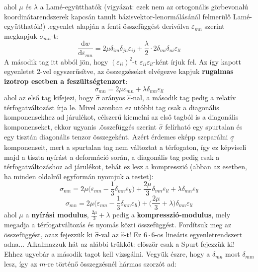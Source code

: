 \documentclass[a4paper, 12pt, titlepage]{article}
\begin{document}
ahol $\mu$ és $\lambda$ a Lamé-együtthatók (vigyázat: ezek nem az ortogonális görbevonalú koordinátarendszerek kapcsán tanult bázisvektor-lenormálásánál felmerülő Lamé-együtthatók!)
\newline
{}.\hspace{1mm}egyenlet alapján a fenti összefüggést deriválva $\varepsilon_{mn}$ szerint megkapjuk $\sigma_{mn}$-t:
\[\frac{\mathrm{d}w}{\mathrm{d}\varepsilon_{mn}}=2\mu\delta_{im}\delta_{jn}\varepsilon_{ij}+\frac{\lambda}{2}\cdot 2\delta_{mi}\delta_{ni}\varepsilon_{ll}\]
A második tag itt abból jön, hogy $(\varepsilon_{ii})^{2}$-t $\varepsilon_{ii}\varepsilon_{ll}$-ként írjuk fel. Az így kapott egyenletet 2-vel egyszerűsítve, az összegzéseket elvégezve kapjuk \textbf{rugalmas izotrop esetben a feszültségtenzort}:
	\begin{equation}
\sigma_{mn}=2\mu\varepsilon_{mn}+\lambda\delta_{mn}\varepsilon_{ll} %
	\label{eq:sigma}
	\end{equation}
ahol az első tag kifejezi, hogy $\hat{\sigma}$ arányos $\hat{\varepsilon}$-nal, a második tag pedig a relatív térfogatváltozást írja le. Mivel azonban ez utóbbi tag csak a diagonális komponensekhez ad járulékot, célszerű kiemelni az első tagból is a diagonális komponenseket, ekkor ugyanis .\hspace{1mm}összefüggés szerint $\hat{\sigma}$ felírható egy spurtalan és egy tisztán diagonális tenzor összegeként. Azért érdemes eképp szeparálni $\underline{\underline{\sigma}}$ komponenseit, mert a spurtalan tag nem változtat a térfogaton, így ez képviseli majd a tiszta nyírást a deformáció során, a diagonális tag pedig csak a térfogatváltozáshoz ad járulékot, tehát ez lesz a kompresszió (abban az esetben, ha minden oldalról egyformán nyomjuk a testet):
\[\sigma_{mn}=2\mu\bigg(\varepsilon_{mn}-\frac{1}{3}\delta_{mn}\varepsilon_{ll}\bigg)+\frac{2\mu}{3}\delta_{mn}\varepsilon_{ll}+\lambda\delta_{mn}\varepsilon_{ll}\]
	\begin{equation}
\sigma_{mn}=2\mu\bigg(\varepsilon_{mn}-\frac{1}{3}\delta_{mn}\varepsilon_{ll}\bigg)+\bigg(\frac{2\mu}{3}+\lambda\bigg)\delta_{mn}\varepsilon_{ll}
	\label{eq:sigmaszep} %
	\end{equation}
ahol $\mu$ a \textbf{nyírási modulus}, $\frac{2\mu}{3}+\lambda$ pedig a \textbf{kompresszió-modulus}, mely megadja a térfogatváltozás és nyomás közti összefüggést.
\newline
Fordítsuk meg az összefüggést, azaz fejezzük ki $\hat{\sigma}$-val az $\hat{\varepsilon}$-t! Ez $6\cdot 6$-os lineáris egyenletrendszert adna... Alkalmazzuk hát az alábbi trükköt: először csak a Spurt fejezzük ki! Ehhez ugyebár a második tagot kell vizsgálni. Vegyük észre, hogy a $\delta_{mn}$ most $\delta_{mm}$ lesz, így az $m$-re történő összegzésnél hármas szorzót ad:
\end{document}
